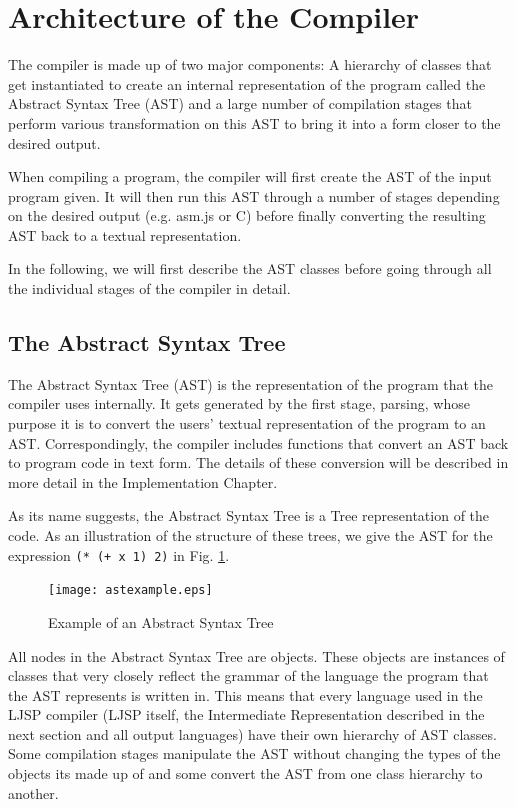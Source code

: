 \documentclass[11pt]{report}
\begin{document}
\section{Architecture of the Compiler}
The compiler is made up of two major components: A hierarchy of classes that get instantiated to create an internal representation of the program called the Abstract Syntax Tree (AST) and a large number of compilation stages that perform various transformation on this AST to bring it into a form closer to the desired output.

When compiling a program, the compiler will first create the AST of the input program given. It will then run this AST through a number of stages depending on the desired output (e.g. asm.js or C) before finally converting the resulting AST back to a textual representation.

In the following, we will first describe the AST classes before going through all the individual stages of the compiler in detail.

\subsection{The Abstract Syntax Tree}
The Abstract Syntax Tree (AST) is the representation of the program that the compiler uses internally. It gets generated by the first stage, parsing, whose purpose it is to convert the users' textual representation of the program to an AST. Correspondingly, the compiler includes functions that convert an AST back to program code in text form. The details of these conversion will be described in more detail in the Implementation Chapter.

As its name suggests, the Abstract Syntax Tree is a Tree representation of the code. As an illustration of the structure of these trees, we give the AST for the expression \hbox{\texttt{(* (+ x 1) 2)}} in Fig. \ref{astexample}.

\begin{figure}[ht]
\begin{center}
\texttt{[image: astexample.eps]}
\end{center}
\caption{Example of an Abstract Syntax Tree}
\label{astexample}
\end{figure}

All nodes in the Abstract Syntax Tree are objects. These objects are instances of classes that very closely reflect the grammar of the language the program that the AST represents is written in. This means that every language used in the LJSP compiler (LJSP itself, the Intermediate Representation described in the next section and all output languages) have their own hierarchy of AST classes. Some compilation stages manipulate the AST without changing the types of the objects its made up of and some convert the AST from one class hierarchy to another. 
\end{document}
